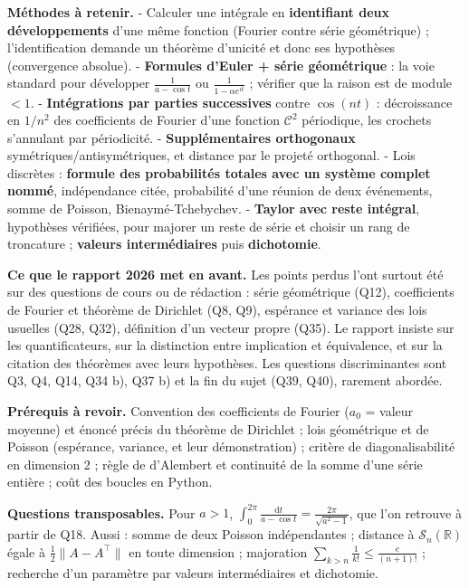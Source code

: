 \documentclass[11pt,a4paper]{article}
\begin{document}
\textbf{Méthodes à retenir.}
- Calculer une intégrale en \textbf{identifiant deux développements} d'une même fonction (Fourier contre série géométrique) ; l'identification demande un théorème d'unicité et donc ses hypothèses (convergence absolue).
- \textbf{Formules d'Euler + série géométrique} : la voie standard pour développer \(\frac1{a-\cos t}\) ou \(\frac1{1-\alpha e^{it}}\) ; vérifier que la raison est de module \(<1\).
- \textbf{Intégrations par parties successives} contre \(\cos(nt)\) : décroissance en \(1/n^2\) des coefficients de Fourier d'une fonction \(\mathcal C^2\) périodique, les crochets s'annulant par périodicité.
- \textbf{Supplémentaires orthogonaux} symétriques/antisymétriques, et distance par le projeté orthogonal.
- Lois discrètes : \textbf{formule des probabilités totales avec un système complet nommé}, indépendance citée, probabilité d'une réunion de deux événements, somme de Poisson, Bienaymé-Tchebychev.
- \textbf{Taylor avec reste intégral}, hypothèses vérifiées, pour majorer un reste de série et choisir un rang de troncature ; \textbf{valeurs intermédiaires} puis \textbf{dichotomie}.

\textbf{Ce que le rapport 2026 met en avant.} Les points perdus l'ont surtout été sur des questions de cours ou de rédaction : série géométrique (Q12), coefficients de Fourier et théorème de Dirichlet (Q8, Q9), espérance et variance des lois usuelles (Q28, Q32), définition d'un vecteur propre (Q35). Le rapport insiste sur les quantificateurs, sur la distinction entre implication et équivalence, et sur la citation des théorèmes avec leurs hypothèses. Les questions discriminantes sont Q3, Q4, Q14, Q34 b), Q37 b) et la fin du sujet (Q39, Q40), rarement abordée.

\textbf{Prérequis à revoir.} Convention des coefficients de Fourier (\(a_0\) = valeur moyenne) et énoncé précis du théorème de Dirichlet ; lois géométrique et de Poisson (espérance, variance, et leur démonstration) ; critère de diagonalisabilité en dimension 2 ; règle de d'Alembert et continuité de la somme d'une série entière ; coût des boucles en Python.

\textbf{Questions transposables.} Pour \(a>1\), \(\int_0^{2\pi}\frac{\mathrm dt}{a-\cos t}=\frac{2\pi}{\sqrt{a^2-1}}\), que l'on retrouve à partir de Q18. Aussi : somme de deux Poisson indépendantes ; distance à \(\mathcal S_n(\mathbb R)\) égale à \(\frac12\|A-A^\top\|\) en toute dimension ; majoration \(\sum_{k>n}\frac1{k!}\le\frac e{(n+1)!}\) ; recherche d'un paramètre par valeurs intermédiaires et dichotomie.
\end{document}

